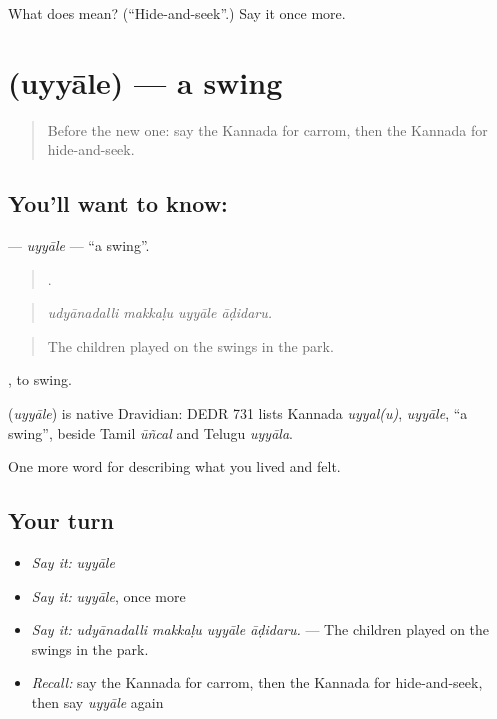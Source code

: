 \begin{tcolorbox}[breakable,colback=teal!4,colframe=teal!35!black,title={Before you move on}]
What does  mean? (\textquotedblleft{}Hide-and-seek\textquotedblright{}.) Say it once more.
\end{tcolorbox}
\section[\texorpdfstring{\kn{ಉಯ್ಯಾಲೆ} (uyyāle)}{ಉಯ್ಯಾಲೆ (uyyāle)}]{ (uyyāle) — a swing}

\label{lesson:KA-C531-uyyale}



\begin{quote}
Before the new one: say the Kannada for carrom, then the Kannada for hide-and-seek.
\end{quote}

\subsection*{You'll want to know: }
\textbf{} — \emph{uyyāle} — \textquotedblleft{}a swing\textquotedblright{}.

\begin{quote}
   .
\end{quote}

\begin{quote}
\emph{udyānadalli makkaḷu uyyāle āḍidaru.}
\end{quote}

\begin{quote}
The children played on the swings in the park.
\end{quote}

 , to swing.

\begin{cousinweb}
\textbf{} (\emph{uyyāle}) is native Dravidian: DEDR 731 lists Kannada \emph{uyyal(u)}, \emph{uyyāle}, \textquotedblleft{}a swing\textquotedblright{}, beside Tamil \emph{ūñcal} and Telugu \emph{uyyāla}.
\end{cousinweb}

\begin{grammarlens}[title={What you've built}]
One more word for describing what you lived and felt.
\end{grammarlens}

\subsection*{Your turn}
\begin{itemize}
\raggedright
  \item \emph{Say it:} \emph{uyyāle}
  \item \emph{Say it:} \emph{uyyāle}, once more
  \item \emph{Say it:} \emph{udyānadalli makkaḷu uyyāle āḍidaru.} — The children played on the swings in the park.
  \item \emph{Recall:} say the Kannada for carrom, then the Kannada for hide-and-seek, then say \emph{uyyāle} again
\end{itemize}

